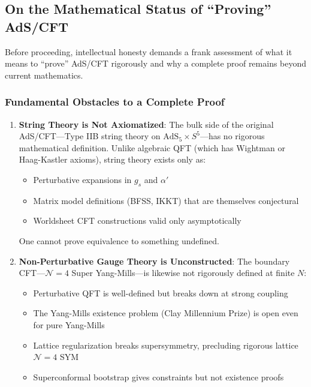 \documentclass[12pt,a4paper]{article}
\begin{document}
\subsection{On the Mathematical Status of ``Proving'' AdS/CFT}
\label{subsec:mathematical-status}

Before proceeding, intellectual honesty demands a frank assessment of what it means to ``prove'' AdS/CFT rigorously and why a complete proof remains beyond current mathematics.

\subsubsection{Fundamental Obstacles to a Complete Proof}

\begin{enumerate}
    \item \textbf{String Theory is Not Axiomatized}: The bulk side of the original AdS/CFT---Type IIB string theory on $\text{AdS}_5 \times S^5$---has no rigorous mathematical definition. Unlike algebraic QFT (which has Wightman or Haag-Kastler axioms), string theory exists only as:
    \begin{itemize}
        \item Perturbative expansions in $g_s$ and $\alpha'$
        \item Matrix model definitions (BFSS, IKKT) that are themselves conjectural
        \item Worldsheet CFT constructions valid only asymptotically
    \end{itemize}
    One cannot prove equivalence to something undefined.
    
    \item \textbf{Non-Perturbative Gauge Theory is Unconstructed}: The boundary CFT---$\mathcal{N}=4$ Super Yang-Mills---is likewise not rigorously defined at finite $N$:
    \begin{itemize}
        \item Perturbative QFT is well-defined but breaks down at strong coupling
        \item The Yang-Mills existence problem (Clay Millennium Prize) is open even for pure Yang-Mills
        \item Lattice regularization breaks supersymmetry, precluding rigorous lattice $\mathcal{N}=4$ SYM
        \item Superconformal bootstrap gives constraints but not existence proofs
    \end{itemize}
    

\end{enumerate}
\end{document}
